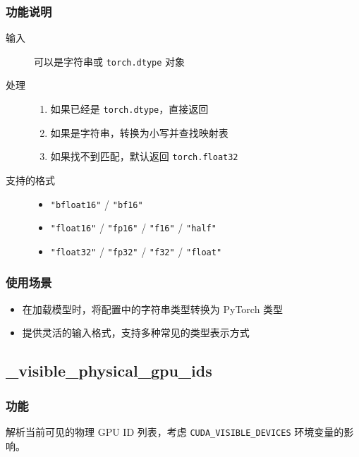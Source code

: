 \documentclass[12pt,a4paper]{article}
\begin{document}
\subsubsection{功能说明}

\begin{description}
    \item[输入] 可以是字符串或 \texttt{torch.dtype} 对象
    \item[处理]
    \begin{enumerate}
        \item 如果已经是 \texttt{torch.dtype}，直接返回
        \item 如果是字符串，转换为小写并查找映射表
        \item 如果找不到匹配，默认返回 \texttt{torch.float32}
    \end{enumerate}
    \item[支持的格式]
    \begin{itemize}
        \item \texttt{"bfloat16"} / \texttt{"bf16"}
        \item \texttt{"float16"} / \texttt{"fp16"} / \texttt{"f16"} / \texttt{"half"}
        \item \texttt{"float32"} / \texttt{"fp32"} / \texttt{"f32"} / \texttt{"float"}
    \end{itemize}
\end{description}

\subsubsection{使用场景}

\begin{itemize}
    \item 在加载模型时，将配置中的字符串类型转换为 PyTorch 类型
    \item 提供灵活的输入格式，支持多种常见的类型表示方式
\end{itemize}

\subsection{\_visible\_physical\_gpu\_ids}

\subsubsection{功能}

解析当前可见的物理 GPU ID 列表，考虑 \texttt{CUDA\_VISIBLE\_DEVICES} 环境变量的影响。
\end{document}
